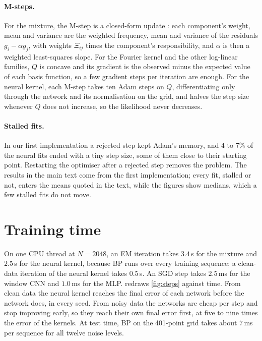 \paragraph{M-steps.} For the mixture, the M-step is a closed-form update \cite{meng1993maximum}: each component's weight,
mean and variance are the weighted frequency, mean and variance of the residuals $g_i-\alpha g_j$, with weights $\Xi_{ij}$
times the component's responsibility, and $\alpha$ is then a weighted least-squares slope. For the Fourier kernel and
the other log-linear families, $Q$ is concave and its gradient is the observed minus the expected value of each basis
function, so a few gradient steps per iteration are enough. For the neural kernel, each M-step takes ten Adam steps on
$Q$, differentiating only through the network and its normalisation on the grid, and halves the step size whenever $Q$
does not increase, so the likelihood never decreases.

\paragraph{Stalled fits.} In our first implementation a rejected step kept Adam's memory, and 4 to 7\% of the neural
fits ended with a tiny step size, some of them close to their starting point. Restarting the optimiser after a rejected
step removes the problem. The results in the main text come from the first implementation; every fit, stalled or not,
enters the means quoted in the text, while the figures show medians, which a few stalled fits do not move.

\section{Training time}
\label{app:compute}

On one CPU thread at $N=2048$, an EM iteration takes $3.4$\,s for the mixture and $2.5$\,s for the neural kernel,
because BP runs over every training sequence; a clean-data iteration of the neural kernel takes $0.5$\,s. An SGD step
takes $2.5$\,ms for the window CNN and $1.0$\,ms for the MLP.  redraws \cref{fig:steps} against time.
From clean data the neural kernel reaches the final error of each network before the network does, in every seed. From
noisy data the networks are cheap per step and stop improving early, so they reach their own final error first, at five
to nine times the error of the kernels. At test time, BP on the 401-point grid takes about $7$\,ms per sequence for all
twelve noise levels.

